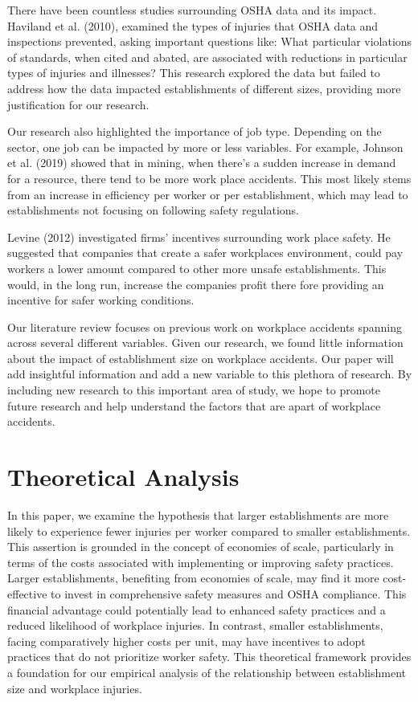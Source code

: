 \documentclass[12pt]{article}
\begin{document}
There have been countless studies surrounding OSHA data and its impact. Haviland et al. (2010), examined the types of injuries that OSHA data and inspections prevented, asking important questions like: What particular violations of standards, when cited and abated, are associated with reductions in particular types of injuries and illnesses? This research explored the data but failed to address how the data impacted establishments of different sizes, providing more justification for our research. 

Our research also highlighted the importance of job type. Depending on the sector, one job can be impacted by more or less variables. For example, Johnson et al. (2019) showed that in mining, when there's a sudden increase in demand for a resource, there tend to be more work place accidents. This most likely stems from an increase in efficiency per worker or per establishment, which may lead to establishments not focusing on following safety regulations. 


Levine (2012) investigated firms' incentives surrounding work place safety. He suggested that companies that create a safer workplaces environment, could pay workers a lower amount compared to other more unsafe establishments. This would, in the long run, increase the companies profit there fore providing an incentive for safer working conditions. 

Our literature review focuses on previous work on workplace accidents spanning across several different variables. Given our research, we found little information about the impact of establishment size on workplace accidents. Our paper will add insightful information and add a new variable to this plethora of research. By including new research to this important area of study, we hope to promote future research and help understand the factors that are apart of workplace accidents. 

\section{Theoretical Analysis}
\label{sec:theory}

In this paper, we examine the hypothesis that larger establishments are more likely to experience fewer injuries per worker compared to smaller establishments. This assertion is grounded in the concept of economies of scale, particularly in terms of the costs associated with implementing or improving safety practices. Larger establishments, benefiting from economies of scale, may find it more cost-effective to invest in comprehensive safety measures and OSHA compliance. This financial advantage could potentially lead to enhanced safety practices and a reduced likelihood of workplace injuries. In contrast, smaller establishments, facing comparatively higher costs per unit, may have incentives to adopt practices that do not prioritize worker safety. This theoretical framework provides a foundation for our empirical analysis of the relationship between establishment size and workplace injuries.
\end{document}
